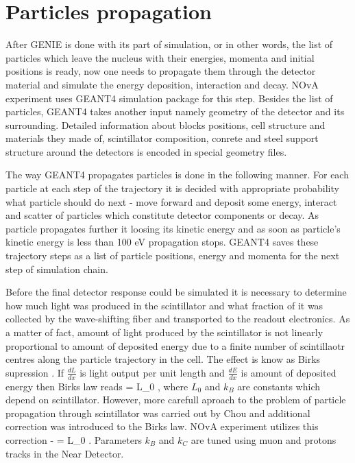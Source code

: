 \section{Particles propagation}
After GENIE is done with its part of simulation, or in other words, the list of particles which leave 
the nucleus with their energies, momenta and initial positions is ready, now one needs to propagate them
through the detector material and simulate the energy deposition, interaction and decay. NOvA experiment
uses GEANT4 \cite{GEANT4} simulation package for this step. Besides the list of particles, GEANT4 takes
another input namely geometry of the detector and its surrounding. Detailed information about blocks 
positions, cell structure and materials they made of, scintillator composition, conrete and steel support
structure around the detectors is encoded in special geometry files.

The way GEANT4 propagates particles is done in the following manner. For each particle at each step of the 
trajectory it is decided with appropriate probability what particle should do next - move forward and deposit 
some energy, interact and scatter of particles which constitute detector components or decay. As particle
propagates further it loosing its kinetic energy and as soon as particle's kinetic energy is less than 100 eV
propagation stops. GEANT4 saves these trajectory steps as a list of particle positions, energy and momenta 
for the next step of simulation chain. 

Before the final detector response could be simulated it is necessary to determine how much light was produced
in the scintillator and what fraction of it was collected by the wave-shifting fiber and transported to the 
readout electronics. As a matter of fact, amount of light produced by the scintillator is not linearly 
proportional to amount of deposited energy due to a finite number of scintillaotr centres along the particle
trajectory in the cell. The effect is know as Birks supression \cite{birks}. If $\frac{dL}{dx}$ is light 
output per unit length and $\frac{dE}{dx}$ is amount of deposited energy then Birks law reads
\be
{} = L_0 , 
\ee
where $L_0$ and $k_B$ are constants which depend on scintillator. However, more carefull aproach to the problem
of particle propagation through scintillator was carried out by Chou \cite{chou} and additional correction was
introduced to the Birks law. NOvA experiment utilizes this correction - 
\be
{} = L_0 .
\ee
Parameters $k_B$ and $k_C$ are tuned using muon and protons tracks in the Near Detector.


